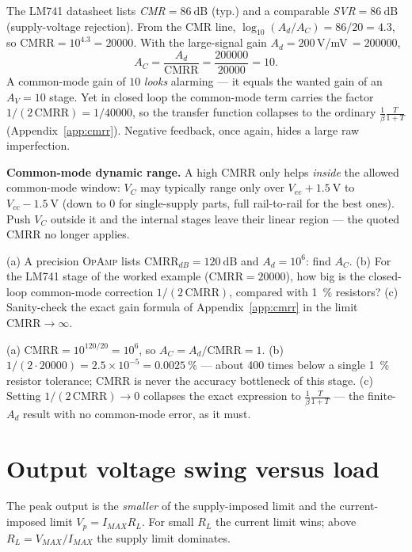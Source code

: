 \documentclass[11pt,a4paper,oneside]{book}
\newcommand{\Ad}{A_d}
\newcommand{\op}{\textsc{OpAmp}}
\begin{document}
\begin{wexample}
The LM741 datasheet lists \emph{CMR}$=\qty{86}{\dB}$ (typ.) and a comparable
\emph{SVR}$=\qty{86}{\dB}$ (supply-voltage rejection). From the CMR line,
$\log_{10}(\Ad/A_C)=86/20=4.3$, so $\text{CMRR}=10^{4.3}=\num{20000}$. With the
large-signal gain $\Ad=\num{200}$\,V/mV$\,=\num{200000}$,
\[
 A_C=\frac{\Ad}{\text{CMRR}}=\frac{\num{200000}}{\num{20000}}=10 .
\]
A common-mode gain of $10$ \emph{looks} alarming --- it equals the wanted gain of an
$A_V=10$ stage. Yet in closed loop the common-mode term carries the factor
$1/(2\,\text{CMRR})=1/\num{40000}$, so the transfer function collapses to the
ordinary $\tfrac1\beta\tfrac{T}{1+T}$ (Appendix~\ref{app:cmrr}). Negative feedback,
once again, hides a large raw imperfection.
\end{wexample}

\begin{note}
\textbf{Common-mode dynamic range.} A high CMRR only helps \emph{inside} the
allowed common-mode window: $V_C$ may typically range only over
$V_{ee}+\qty{1.5}{\volt}$ to $V_{cc}-\qty{1.5}{\volt}$ (down to $0$ for
single-supply parts, full rail-to-rail for the best ones). Push $V_C$ outside it and
the internal stages leave their linear region --- the quoted CMRR no longer applies.
\end{note}

\begin{exercise}
(a) A precision \op{} lists $\text{CMRR}_{dB}=\qty{120}{\dB}$ and $\Ad=10^6$:
find $A_C$. (b) For the LM741 stage of the worked example
($\text{CMRR}=\num{20000}$), how big is the closed-loop common-mode correction
$1/(2\,\text{CMRR})$, compared with \qty{1}{\percent} resistors? (c) Sanity-check
the exact gain formula of Appendix~\ref{app:cmrr} in the limit
$\text{CMRR}\to\infty$.
\end{exercise}
\begin{solution}
(a) $\text{CMRR}=10^{120/20}=10^6$, so $A_C=\Ad/\text{CMRR}=1$.
(b) $1/(2\cdot\num{20000})=2.5\times10^{-5}=\qty{0.0025}{\percent}$ --- about 400
times below a single \qty{1}{\percent} resistor tolerance; CMRR is never the
accuracy bottleneck of this stage.
(c) Setting $1/(2\,\text{CMRR})\to0$ collapses the exact expression to
$\frac1\beta\frac{T}{1+T}$ --- the finite-$\Ad$ result with no common-mode error,
as it must.
\end{solution}

\section{Output voltage swing versus load}
The peak output is the \emph{smaller} of the supply-imposed limit and the
current-imposed limit $V_p=I_{MAX}R_L$. For small $R_L$ the current limit wins;
above $R_L=V_{MAX}/I_{MAX}$ the supply limit dominates.
\end{document}
